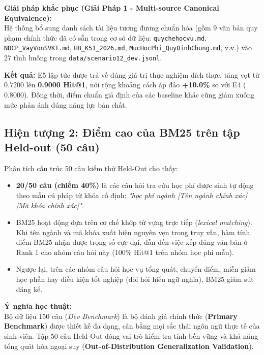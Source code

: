 \documentclass[a4paper,10pt]{article}
\begin{document}
\textbf{Giải pháp khắc phục (Giải Pháp 1 - Multi-source Canonical Equivalence):}\\
Hệ thống bổ sung danh sách tài liệu tương đương chuẩn hóa (gồm 9 văn bản quy phạm chính thức đã có sẵn trong cơ sở dữ liệu: \texttt{quychehocvu.md}, \texttt{NDCP\_VayVonSVKT.md}, \texttt{HB\_K51\_2026.md}, \texttt{MucHocPhi\_QuyDinhChung.md}, v.v.) vào 27 tình huống trong \texttt{data/scenario12\_dev.jsonl}. 

\textbf{Kết quả:} E5 lập tức được trả về đúng giá trị thực nghiệm đích thực, tăng vọt từ $0.7200$ lên \textbf{0.9000 Hit@1}, nới rộng khoảng cách áp đảo \textbf{+10.0\%} so với E4 ($0.8000$). Đồng thời, điểm chuẩn giả định của các baseline khác cũng giảm xuống mức phản ánh đúng năng lực bản chất.

\subsection{Hiện tượng 2: Điểm cao của BM25 trên tập Held-out (50 câu)}
\begin{infobox}
Phân tích cấu trúc 50 câu kiểm thử Held-Out cho thấy:
\begin{itemize}[itemsep=1.5pt,topsep=1.5pt]
    \item \textbf{20/50 câu (chiếm 40\%)} là các câu hỏi tra cứu học phí được sinh tự động theo mẫu cú pháp từ khóa cố định: \textit{"học phí ngành [Tên ngành chính xác] [Mã khóa chính xác]"}.
    \item BM25 hoạt động dựa trên cơ chế khớp từ vựng trực tiếp (\textit{lexical matching}). Khi tên ngành và mã khóa xuất hiện nguyên vẹn trong truy vấn, hàm tính điểm BM25 nhận được trọng số cực đại, dẫn đến việc xếp đúng văn bản ở Rank 1 cho nhóm câu hỏi này ($100\%$ Hit@1 trên nhóm học phí mẫu).
    \item Ngược lại, trên các nhóm câu hỏi học vụ tổng quát, chuyển điểm, miễn giảm học phần hay điều kiện tốt nghiệp (đòi hỏi hiểu ngữ nghĩa), BM25 giảm sút đáng kể.
\end{itemize}
\end{infobox}

\textbf{Ý nghĩa học thuật:} \\
Bộ dữ liệu 150 câu (\textit{Dev Benchmark}) là bộ đánh giá chính thức (\textbf{Primary Benchmark}) được thiết kế đa dạng, cân bằng mọi sắc thái ngôn ngữ thực tế của sinh viên. Tập 50 câu Held-Out đóng vai trò kiểm tra tính bền vững và khả năng tổng quát hóa ngoại suy (\textbf{Out-of-Distribution Generalization Validation}).
\end{document}
